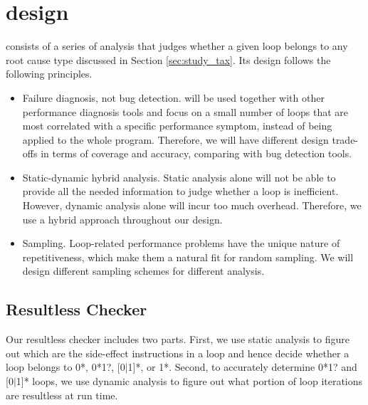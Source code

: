 \section{\Tool design}
\label{sec:design}
\Tool consists of a series of analysis that
judges whether a given loop belongs to any root cause type discussed in
Section \ref{sec:study_tax}.
Its design
follows the following principles.
\begin{itemize}
\item Failure diagnosis, not bug detection. \Tool will be  
used together with other performance diagnosis tools \cite{SongOOPSLA2014}
and focus on a small
number of loops that are most correlated with a specific performance symptom,
instead of being applied to the whole program. Therefore, we will have different
design trade-offs in terms of coverage and accuracy, comparing with 
bug detection tools.

\item Static-dynamic hybrid analysis. Static analysis alone
will not be able to provide all the needed information to judge whether
a loop is inefficient. However, 
dynamic analysis alone will incur too much overhead.
Therefore, we use a hybrid approach throughout our design.

\item Sampling. Loop-related 
performance problems have the unique nature of repetitiveness, which make 
them a natural fit for random sampling. We will design different
sampling schemes for different analysis.
\end{itemize}

\subsection{Resultless Checker}
\label{sec:workless}

Our resultless checker includes two parts. First, we use static analysis
to figure out which are the side-effect instructions in a loop and hence
decide whether a loop belongs to 0*, 0*1?, [0$|$1]*, or 1*. Second, to
accurately determine 0*1? and [0$|$1]* loops, we use
dynamic analysis to figure out what portion of loop iterations are
resultless at run time.


